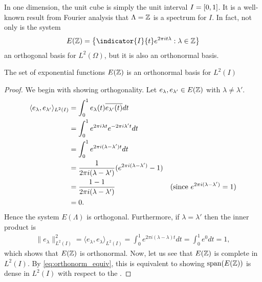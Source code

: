 \documentclass[../thesis.tex]{subfiles}
\begin{document}
In one dimension, the unit cube is simply the unit interval $I=[0,1]$. It is a well-known result from Fourier analysis that $\Lambda = \mathbb{Z}$ is a spectrum for $I$. In fact, not only is the system
\begin{equation*}
    E(\Z) = \braqMed{\indicator{I}{t} e^{2\pi i t \lambda} : \lambda \in \Z}
\end{equation*} 
an orthogonal basis for $L^2(\Omega)$, but it is also an orthonormal basis.
\begin{lemma}\label{lem:exp_onb_onedim}
    The set of exponential functions $E(\mathbb{Z})$ is an orthonormal basis for $L^2(I)$
\end{lemma}
\begin{proof}
    We begin with showing orthogonality. Let $e_{\lambda}, e_{\lambda'} \in E(\mathbb{Z})$ with $\lambda \neq \lambda'$. %
    \begin{align}\label{eq:orthog_one_dim_req}
        \langle e_{\lambda},e_{\lambda'} \rangle_{L^2(I)} &= \int_0^1 e_{\lambda}(t)\overline{e_{\lambda'}(t)} dt \nonumber\\ 
        &= \int_0^1 e^{2 \pi i {\lambda}t} e^{-2 \pi i {\lambda'}t} dt \nonumber\\
        &= \int_0^1 e^{2 \pi i (\lambda-\lambda')t} dt \nonumber\\
        &=\frac{1}{2 \pi i (\lambda-\lambda')} (e^{2 \pi i (\lambda - \lambda')} -1) \\
        &=\frac{1-1}{2 \pi i (\lambda-\lambda')} & (\text{since } e^{2 \pi i (\lambda-\lambda')} = 1) \nonumber\\
        &= 0 \nonumber.
    \end{align}
    Hence the system $E(\Lambda)$ is orthogonal. Furthermore, if $\lambda =\lambda'$ then the inner product is
    \begin{align*}\label{eq:exp_norm_one}
        \| e_\lambda \|^2_{L^2(I)} 
        = \langle e_{\lambda},e_{\lambda} \rangle_{L^2(I)} 
        = \int_0^1 e^{2 \pi i (\lambda-\lambda)t} dt
        = \int_0^1 e^{0} dt = 1,
    \end{align*}
    which shows that $E(\mathbb{Z})$ is orthonormal. Now, let us see that $E(\mathbb{Z})$ is complete in $L^2(I)$. By \cref{eq:orthonorm_equiv}, this is equivalent to showing $\operatorname{span}(E(\mathbb{Z}))$ is dense in $L^2(I)$ with respect to the \Ltwonorm. 

\end{proof}
\end{document}
